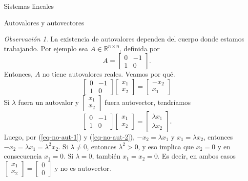 \documentclass[a4paper,12pt,twoside,spanish,reqno]{amsbook}
\theoremstyle{definition}
\theoremstyle{remark}
\newtheorem{observacion}{Observaci\'on}[section]
\newcommand{\R}{\mathbb R}
\begin{document}
\begin{chapter}{Sistemas lineales}
\begin{section}{Autovalores y autovectores}
        \begin{observacion}
        La existencia de autovalores dependen del cuerpo donde estamos trabajando. 
        Por ejemplo sea $A \in \R^{n\times n}$,  definida por 
        $$A=
        \begin{bmatrix}
            0&-1\\1&0
        \end{bmatrix}
        .$$ 
        Entonces,  $A$ no tiene autovalores reales. Veamos por qué.
        \begin{equation}\label{eq-no-aut-1}
            \begin{bmatrix}
                0&-1\\1&0
            \end{bmatrix}
            \begin{bmatrix}
                x_1\\x_2
            \end{bmatrix} =
            \begin{bmatrix}
                -x_2\\x_1
            \end{bmatrix}
        \end{equation}
        Si $\lambda$ fuera un autovalor y $\begin{bmatrix}x_1\\x_2\end{bmatrix}$ fuera autovector, tendríamos
        \begin{equation}\label{eq-no-aut-2}
            \begin{bmatrix}
                0&-1\\1&0
            \end{bmatrix}
            \begin{bmatrix}
                x_1\\x_2
            \end{bmatrix} =
            \begin{bmatrix}
                \lambda x_1\\\lambda x_2
            \end{bmatrix}.
        \end{equation}
        Luego, por (\ref{eq-no-aut-1}) y (\ref{eq-no-aut-2}), $-x_2 = \lambda x_1$ y $x_1 = \lambda x_2$,  entonces   $-x_2 = \lambda x_1 = \lambda^2 x_2$. Si  $\lambda \ne0$,  entonces $\lambda^2 >0$, y eso implica que $x_2=0$ y  en consecuencia $x_1=0$. Si $\lambda=0$, también $x_1=x_2 =0$. Es decir, en ambos casos $\begin{bmatrix}x_1\\x_2\end{bmatrix} = \begin{bmatrix}0\\0\end{bmatrix} $ y no es autovector.


\end{observacion}
\end{section}
\end{chapter}
\end{document}
